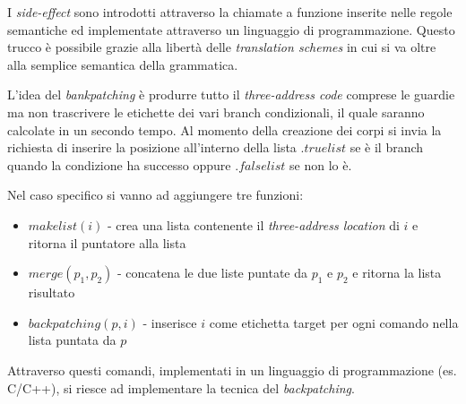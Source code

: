 I \textit{side-effect} sono introdotti attraverso la chiamate a funzione
inserite nelle regole semantiche ed implementate attraverso un linguaggio di
programmazione. Questo trucco \`e possibile grazie alla libert\`a delle
\textit{translation schemes} in cui si va oltre alla semplice semantica della
grammatica.

L'idea del \textit{bankpatching} \`e produrre tutto il
\textit{three-address code} comprese le guardie ma non trascrivere le etichette
dei vari branch condizionali, il quale saranno calcolate in un secondo tempo.
Al momento della creazione dei corpi si invia la richiesta di inserire la
posizione all'interno della lista $.truelist$ se \`e il branch quando la
condizione ha successo oppure $.falselist$ se non lo \`e.

Nel caso specifico si vanno ad aggiungere tre funzioni:
\begin{itemize}
\item $makelist(i)$ - crea una lista contenente il \textit{three-address
location} di $i$ e ritorna il puntatore alla lista
\item $merge(p_1,p_2)$ - concatena le due liste puntate da $p_1$ e $p_2$ e
ritorna la lista risultato
\item $backpatching(p,i)$ - inserisce $i$ come etichetta target per ogni
comando nella lista puntata da $p$
\end{itemize}

Attraverso questi comandi, implementati in un linguaggio di programmazione
(es. C/C++), si riesce ad implementare la tecnica del \textit{backpatching}.
